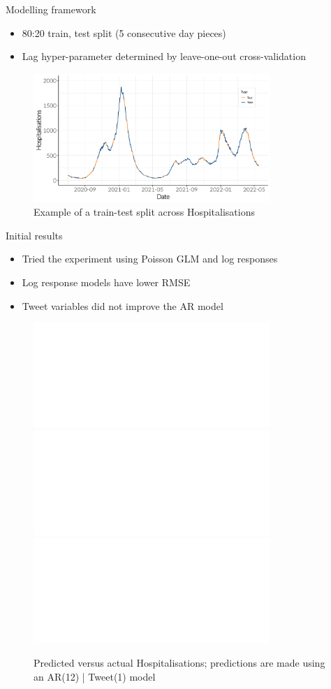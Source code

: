 \documentclass{beamer}
\begin{document}
\begin{frame}{Modelling framework}
  \begin{itemize}
  \item 80:20 train, test split (5 consecutive day pieces) \\[5pt]
  \item Lag hyper-parameter determined by leave-one-out cross-validation 
  \end{itemize}
 \begin{figure}[!ht]
    \centering
    \includegraphics[width=0.8\textwidth]{figures/train_test_split.pdf} 
    \caption{Example of a train-test split across Hospitalisations}
  \end{figure}
\end{frame}

\begin{frame}{Initial results}
  \begin{itemize}
   \item Tried the experiment using Poisson GLM and log responses\\[3pt]
   \item Log response models have lower RMSE \\[3pt]
   \item Tweet variables did not improve the AR model
   \end{itemize}
  
  \begin{figure}[!ht]
    \centering
    \includegraphics<1>[width=0.8\textwidth]{figures/result_plot_full.pdf}%
    \includegraphics<2>[width=0.8\textwidth]{figures/result_plot_train_p.pdf}%
    \includegraphics<3>[width=0.8\textwidth]{figures/result_plot_test_p.pdf}%
    \caption{Predicted versus actual Hospitalisations; predictions are
      made using an AR(12) | Tweet(1) model  }
  \end{figure}
\end{frame}
\end{document}
